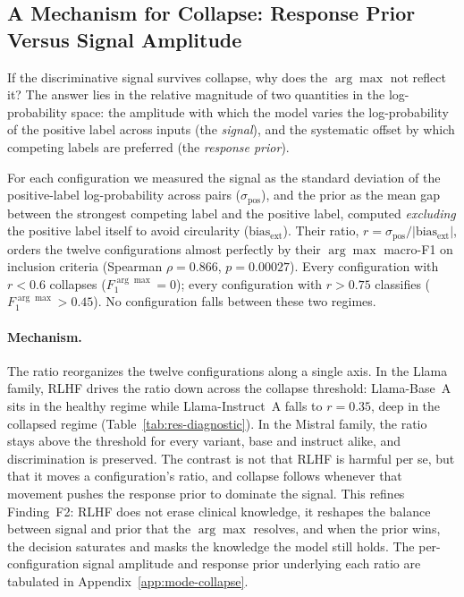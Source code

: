 \subsection{A Mechanism for Collapse: Response Prior Versus Signal 
    Amplitude}
\label{subsec:res-collapse-mechanism}

If the discriminative signal survives collapse, why does the $\arg\max$ 
not reflect it? The answer lies in the relative magnitude of two 
quantities in the log-probability space: the amplitude with which the 
model varies the log-probability of the positive label across inputs 
(the \emph{signal}), and the systematic offset by which competing labels 
are preferred (the \emph{response prior}).

For each configuration we measured the signal as the standard deviation 
of the positive-label log-probability across pairs 
($\sigma_{\text{pos}}$), and the prior as the mean gap between the 
strongest competing label and the positive label, computed 
\emph{excluding} the positive label itself to avoid circularity 
($\text{bias}_{\text{ext}}$). Their ratio, 
$r = \sigma_{\text{pos}} / |\text{bias}_{\text{ext}}|$, orders the twelve 
configurations almost perfectly by their $\arg\max$ macro-F1 on inclusion 
criteria (Spearman $\rho = 0.866$, $p = 0.00027$). Every configuration 
with $r < 0.6$ collapses ($F_1^{\arg\max} = 0$); every configuration with 
$r > 0.75$ classifies ($F_1^{\arg\max} > 0.45$). No configuration falls 
between these two regimes.

\paragraph{Mechanism.} The ratio reorganizes the twelve configurations 
along a single axis. In the Llama family, RLHF drives the ratio down 
across the collapse threshold: Llama-Base~A sits in the healthy regime 
while Llama-Instruct~A falls to $r = 0.35$, deep in the collapsed regime 
(Table~\ref{tab:res-diagnostic}). In the Mistral family, the ratio stays 
above the threshold for every variant, base and instruct alike, and 
discrimination is preserved. The contrast is not that RLHF is harmful 
per se, but that it moves a configuration's ratio, and collapse follows 
whenever that movement pushes the response prior to dominate the signal. 
This refines Finding~F2: RLHF does not erase clinical knowledge, it 
reshapes the balance between signal and prior that the $\arg\max$ 
resolves, and when the prior wins, the decision saturates and masks the 
knowledge the model still holds. The per-configuration signal amplitude 
and response prior underlying each ratio are tabulated in 
Appendix~\ref{app:mode-collapse}.

